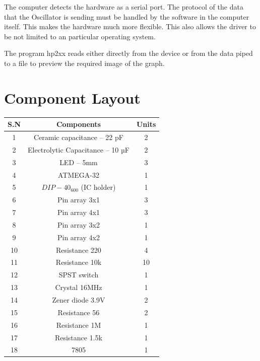 \documentclass[12pt]{article}
\begin{document}
The computer detects the hardware as a serial port. The protocol of the data that the Oscillator is sending must be handled by the software in the computer itself. This makes the hardware much more flexible. This also allows the driver to be not limited to an particular operating system.

The program hp2xx reads either directly from the device or from the data piped to a file to preview the required image of the graph.

\newpage
\section{Component Layout}
\begin{tabular}{|c|c|c|}
\hline
S.N	& Components &	Units\\
\hline
1 & Ceramic capacitance – 22 pF	&2\\
2	&Electrolytic Capacitance – 10 µF&	2\\
3	&LED – 5mm	&3\\
4	&ATMEGA-32	&1\\
5	&\(DIP-40_600\) (IC holder)&	1\\
6&	Pin array 3x1	&3\\
7&	Pin array 4x1	&3\\
8&	Pin array 3x2	&1\\
9	&Pin array 4x2	&1\\
10	&Resistance 220	&4\\
11	&Resistance 10k	&10\\
12&	SPST switch	&1\\
13&	Crystal 16MHz	&1\\
14& Zener diode 3.9V &               2\\
15& Resistance 56     &                           2\\
16& Resistance 1M      &                  1\\
17& Resistance 1.5k     &    1\\
18 &7805&     1\\
\hline

\end{tabular}
\newpage
\end{document}
